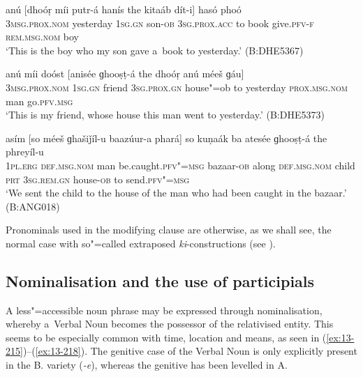 \begin{exe}
\ex
\label{ex:13-212}
\gll anú [dhoóṛ míi putr-á hanís the  kitaáb dít-i] hasó phoó  \\
\textsc{3msg.prox.nom} yesterday \textsc{1sg.gn} son-\textsc{ob} \textsc{3sg.prox.acc} to  book give.\textsc{pfv-f} \textsc{rem.msg.nom} boy \\
\glt `This is the boy who my son gave a~book to yesterday.' (B:DHE5367)

\ex
\label{ex:13-213}
\gll anú míi doóst [anisée ɡhooṣṭ-á the  dhoóṛ anú méeš ɡáu] \\
\textsc{3msg.prox.nom} \textsc{1sg.gn} friend \textsc{3sg.prox.gn} house"=ob to  yesterday \textsc{prox.msg.nom} man go.\textsc{pfv.msg} \\
\glt `This is my friend, whose house this man went to yesterday.' (B:DHE5373)

\ex
\label{ex:13-214}
\gll asím [so méeš ɡhašiǰíl-u baazúur-a  phará] so kuṇaák ba atesée
ɡhooṣṭ-á  the phreyíl-u \\
\textsc{1pl.erg} \textsc{def.msg.nom} man be.caught.\textsc{pfv"=msg} bazaar-\textsc{ob}  along \textsc{ def.msg.nom} child \textsc{prt} \textsc{3sg.rem.gn} house-\textsc{ob} to send.\textsc{pfv"=msg} \\
\glt `We sent the child to the house of the man who had been caught in the bazaar.' (B:ANG018) 
\end{exe}

Pronominals used in the modifying clause are otherwise, as we shall see, the normal case with so"=called extraposed \textit{ki}-constructions (see ). 


\subsection{Nominalisation and the use of participials}
\label{subsec:13-6-6}

A less"=accessible noun phrase may be expressed through nominalisation, whereby a~Verbal Noun becomes the possessor of the relativised entity. This seems to be especially common with time, location and means, as seen in (\ref{ex:13-215})--(\ref{ex:13-218}). The genitive case of the Verbal Noun is only explicitly present in the B. variety (\textit{-e}), whereas the genitive has been levelled in A.

